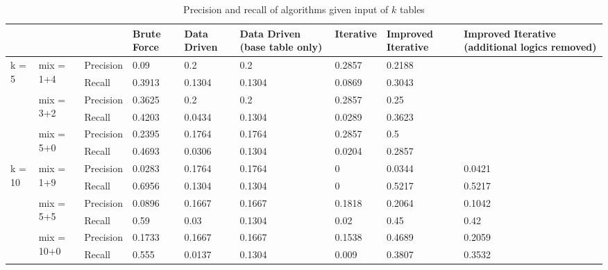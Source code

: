 \begin{table}[ht!]
    \centering
    \scriptsize
    \begin{center}
      \caption{Precision and recall of algorithms given input of $k$ tables}
      \label{tab:Precision-and-recall-of-algorithms-given-input-of-k-tables}
      \begin{tabular}{|p{}|p{}|p{}|p{}|p{}|p{}|p{}|p{}|p{}|}  
        \hline
        & & & \textbf{Brute Force} & \textbf{Data Driven} & \textbf{Data Driven (base table only)} & \textbf{Iterative} & \textbf{Improved Iterative} & \textbf{Improved Iterative (additional logics removed)}\\
        \hline
        \multirow{6}{*}{k = 5} & \multirow{2}{*}{mix = 1+4} & Precision & 0.09 & 0.2 & 0.2 & 0.2857 & 0.2188 & \\
        \cline{3-9}
        & & Recall & 0.3913 & 0.1304 & 0.1304 & 0.0869 & 0.3043 & \\
        \cline{2-9}
        & \multirow{2}{*}{mix = 3+2} & Precision & 0.3625 & 0.2 &  0.2 & 0.2857 & 0.25 & \\
        \cline{3-9}
        & & Recall & 0.4203 & 0.0434 & 0.1304 & 0.0289 & 0.3623 & \\
        \cline{2-9}
        & \multirow{2}{*}{mix = 5+0} & Precision & 0.2395 & 0.1764 & 0.1764 & 0.2857 & 0.5 & \\
        \cline{3-9}
        & & Recall & 0.4693 & 0.0306 & 0.1304 & 0.0204 & 0.2857 & \\
        \hline        
        \multirow{6}{*}{k = 10} & \multirow{2}{*}{mix = 1+9} & Precision & 0.0283 & 0.1764 & 0.1764 & 0 & 0.0344 & 0.0421 \\
        \cline{3-9}
        & & Recall & 0.6956 & 0.1304 & 0.1304 & 0 & 0.5217 & 0.5217 \\
        \cline{2-9}
        & \multirow{2}{*}{mix = 5+5} & Precision & 0.0896 & 0.1667 & 0.1667 & 0.1818 & 0.2064 & 0.1042 \\
        \cline{3-9}
        & & Recall & 0.59 & 0.03 & 0.1304 & 0.02 & 0.45 & 0.42 \\
        \cline{2-9}
        & \multirow{2}{*}{mix = 10+0} & Precision & 0.1733 & 0.1667 & 0.1667 & 0.1538 & 0.4689 & 0.2059 \\
        \cline{3-9}
        & & Recall & 0.555 & 0.0137 & 0.1304 & 0.009 & 0.3807 & 0.3532 \\
        \hline
      \end{tabular}
    \end{center}
\end{table}

